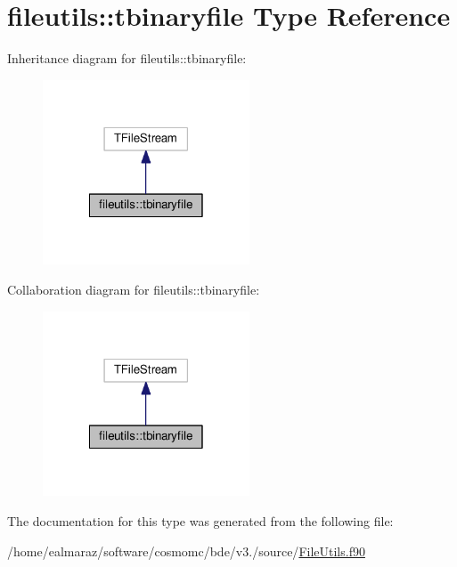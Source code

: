 \hypertarget{structfileutils_1_1tbinaryfile}{}\section{fileutils\+:\+:tbinaryfile Type Reference}
\label{structfileutils_1_1tbinaryfile}


Inheritance diagram for fileutils\+:\+:tbinaryfile\+:
\nopagebreak
\begin{figure}[H]
\begin{center}
\leavevmode
\includegraphics[width=174pt]{structfileutils_1_1tbinaryfile__inherit__graph}
\end{center}
\end{figure}


Collaboration diagram for fileutils\+:\+:tbinaryfile\+:
\nopagebreak
\begin{figure}[H]
\begin{center}
\leavevmode
\includegraphics[width=174pt]{structfileutils_1_1tbinaryfile__coll__graph}
\end{center}
\end{figure}


The documentation for this type was generated from the following file\+:\begin{DoxyCompactItemize}
\item 
/home/ealmaraz/software/cosmomc/bde/v3./source/\mbox{\hyperlink{FileUtils_8f90}{File\+Utils.\+f90}}\end{DoxyCompactItemize}
